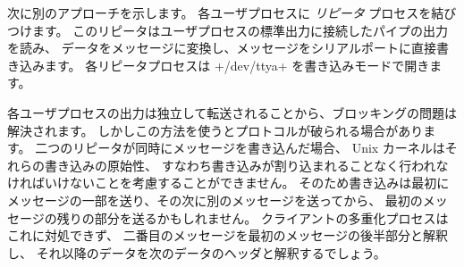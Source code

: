 次に別のアプローチを示します。
各ユーザプロセスに \emph{リピータ} プロセスを結びつけます。
このリピータはユーザプロセスの標準出力に接続したパイプの出力を読み、
データをメッセージに変換し、メッセージをシリアルポートに直接書き込みます。
各リピータプロセスは \ml+/dev/ttya+ を書き込みモードで開きます。
%
\begin{myimage}[width="100\%"]
\end{myimage}
%

各ユーザプロセスの出力は独立して転送されることから、ブロッキングの問題は解決されます。
しかしこの方法を使うとプロトコルが破られる場合があります。
二つのリピータが同時にメッセージを書き込んだ場合、 Unix カーネルはそれらの書き込みの原始性、
すなわち書き込みが割り込まれることなく行われなければいけないことを考慮することができません。
そのため書き込みは最初にメッセージの一部を送り、その次に別のメッセージを送ってから、
最初のメッセージの残りの部分を送るかもしれません。
クライアントの多重化プロセスはこれに対処できず、
二番目のメッセージを最初のメッセージの後半部分と解釈し、
それ以降のデータを次のデータのヘッダと解釈するでしょう。

